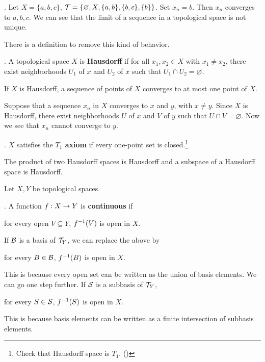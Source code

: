 \ex. Let \(X = \{a, b, c\}\), \(\mathcal{T} = \{\varnothing, X, \{a, b\}, \{b, c\}, \{b\}\}\). Set \(x_n = b\). Then \(x_n\) converges to \(a, b, c\). We can see that the limit of a sequence in a topological space is not unique.

There is a definition to remove this kind of behavior.

.  A topological space \(X\) is \textbf{Hausdorff} if for all \(x_1, x_2 \in X\) with \(x_1 \neq x_2\), there exist neighborhoods \(U_1\) of \(x\) and \(U_2\) of \(x\) such that \(U_1 \cap U_2 = \varnothing\).

 If \(X\) is Hausdorff, a sequence of points of \(X\) converges to at most one point of \(X\).

\pf Suppose that a sequence \(x_n\) in \(X\) converges to \(x\) and \(y\), with \(x \neq y\). Since \(X\) is Hausdorff, there exist neighborhoods \(U\) of \(x\) and \(V\) of \(y\) such that \(U \cap V = \varnothing\). Now we see that \(x_n\) cannot converge to \(y\).

. \(X\) satisfies the \textbf{\(T_1\) axiom} if every one-point set is closed.\footnote{Check that Hausdorff space is \(T_1\). ()}

 The product of two Hausdorff spaces is Hausdorff and a subspace of a Hausdorff space is Hausdorff.

\pagebreak


Let \(X, Y\) be topological spaces.

.  A function \(f : X \rightarrow Y\) is \textbf{continuous} if
\begin{center}
    for every open \(V \subseteq Y\), \(f^{-1}(V)\) is open in \(X\).
\end{center}

\rmk If \(\mathcal{B}\) is a basis of \(\mathcal{T}_Y\), we can replace the above by
\begin{center}
    for every \(B \in \mathcal{B}\), \(f^{-1}(B)\) is open in \(X\).
\end{center}
This is because every open set can be written as the union of basis elements. We can go one step further. If \(\mathcal{S}\) is a subbasis of \(\mathcal{T}_Y\),
\begin{center}
    for every \(S \in \mathcal{S}\), \(f^{-1}(S)\) is open in \(X\).
\end{center}
This is because basis elements can be written as a finite intersection of subbasis elements.

